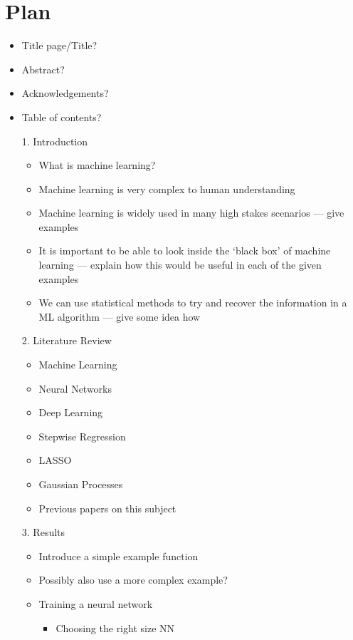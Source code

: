 
\chapter*{Plan}
\begin{itemize}
	\item Title page/Title?
	\item Abstract?
	\item Acknowledgements?
	\item Table of contents?
	\item[1.] Introduction
	      \begin{itemize}
		      \item What is machine learning?
		      \item Machine learning is very complex to human understanding
		      \item Machine learning is widely used in many high stakes scenarios --- give examples
		      \item It is important to be able to look inside the `black box' of machine learning --- explain how this would be useful in each of the given examples
		      \item We can use statistical methods to try and recover the information in a ML algorithm --- give some idea how
	      \end{itemize}
	\item[2.] Literature Review
	      \begin{itemize}
		      \item Machine Learning
		      \item Neural Networks
		      \item Deep Learning
		      \item Stepwise Regression
		      \item LASSO
		      \item Gaussian Processes
		      \item Previous papers on this subject
	      \end{itemize}
	\item[3.] Results
	      \begin{itemize}
		      \item Introduce a simple example function
		      \item Possibly also use a more complex example?
		      \item Training a neural network
		            \begin{itemize}
			            \item Choosing the right size NN

\end{itemize}
\end{itemize}
\end{itemize}
